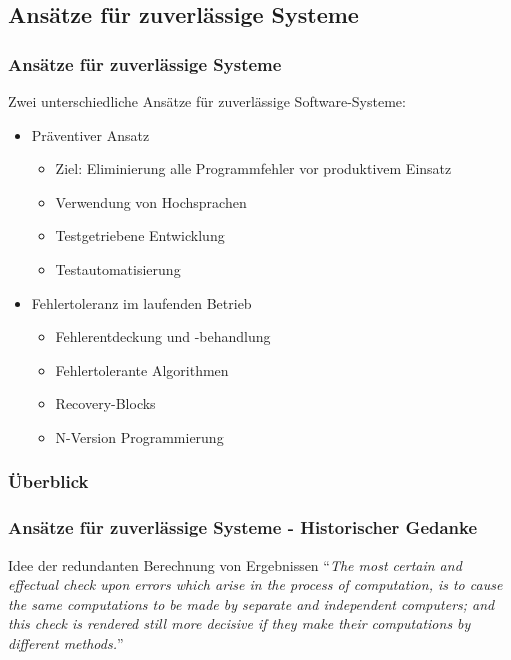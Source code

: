 \subsection{Ansätze für zuverlässige Systeme}
%
\begin{frame}
	\frametitle{Ansätze für zuverlässige Systeme}
	Zwei unterschiedliche Ansätze für zuverlässige Software-Systeme:
		
		\begin{itemize}
			\pause
			\item Präventiver Ansatz
			\begin{itemize}
				\item Ziel: Eliminierung alle Programmfehler vor produktivem Einsatz
				\item Verwendung von Hochsprachen
				\item Testgetriebene Entwicklung
				\item Testautomatisierung	
			\end{itemize}
			\pause	
			\item Fehlertoleranz im laufenden Betrieb	
			\begin{itemize}
				\item Fehlerentdeckung und -behandlung
				\item Fehlertolerante Algorithmen
				\item Recovery-Blocks
				\item N-Version Programmierung
			\end{itemize}
			
		\end{itemize}	
\end{frame}
%
%
\begin{frame}
	\frametitle{Überblick}
	\tableofcontents[currentsubsection]
\end{frame}
%
%
\begin{frame}
	\frametitle{Ansätze für zuverlässige Systeme - Historischer Gedanke}
	\begin{block}{Idee der redundanten Berechnung von Ergebnissen \cite{lardner}}
		\enquote{\emph{The most certain and effectual check upon errors which arise in the process of computation,	is to cause the same computations to be made by separate and independent computers; and this	check is rendered still more decisive if they make their computations by different methods.}}
	\end{block}
\end{frame}
%
%
